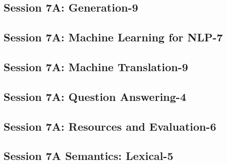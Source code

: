\subsection{\large Session 7A: Generation-9}
\label{parallel-session-7A-trackB}
\TrackBLoc\hfill\sessionchair{}{}
\clearpage
\subsection{\large Session 7A: Machine Learning for NLP-7}
\label{parallel-session-7A-trackC}
\TrackCLoc\hfill\sessionchair{}{}
\clearpage
\subsection{\large Session 7A: Machine Translation-9}
\label{parallel-session-7A-trackD}
\TrackDLoc\hfill\sessionchair{}{}
\clearpage
\subsection{\large Session 7A: Question Answering-4}
\label{parallel-session-7A-trackE}
\TrackELoc\hfill\sessionchair{}{}
\clearpage
\subsection{\large Session 7A: Resources and Evaluation-6}
\label{parallel-session-7A-trackF}
\TrackFLoc\hfill\sessionchair{}{}
\clearpage
\subsection{\large Session 7A Semantics: Lexical-5}
\label{parallel-session-7A-trackG}
\TrackGLoc\hfill\sessionchair{}{}
\clearpage
